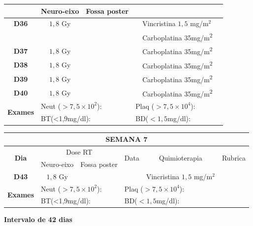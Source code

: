 \documentclass[11pt,a4paper,oldfontcommands]{memoir}
\begin{document}
\begin{center}
\begin{table}[H]
\begin{tabular}{p{1cm}p{2cm}|p{2cm}|p{1cm}|p{4cm}|p{3cm}}
    \cline{2-3}
    \multicolumn{1}{c|}{\multirow{1}{*}{}}&{Neuro-eixo}&{Fossa poster}&& \\
	\hline
	\multicolumn{1}{c|}{\multirow{1}{*}{\textbf{D36}}}&\multicolumn{1}{c|}{\(1,8\) Gy}&&&{Vincristina \(1,5\) mg/m\(^2\)}&\\
	\multicolumn{1}{c|}{\multirow{1}{*}{\textbf{}}}&\multicolumn{1}{c|}{}&&&{Carboplatina 35mg/m\textsuperscript{2}}&\\
    \multicolumn{1}{c|}{\multirow{1}{*}{\textbf{D37}}}&\multicolumn{1}{c|}{\(1,8\) Gy}&&&{Carboplatina 35mg/m\textsuperscript{2}}&\\
    \multicolumn{1}{c|}{\multirow{1}{*}{\textbf{D38}}}&\multicolumn{1}{c|}{\(1,8\) Gy}&&&{Carboplatina 35mg/m\textsuperscript{2}}&\\
    \multicolumn{1}{c|}{\multirow{1}{*}{\textbf{D39}}}&\multicolumn{1}{c|}{\(1,8\) Gy}&&&{Carboplatina 35mg/m\textsuperscript{2}}&\\
    \multicolumn{1}{c|}{\multirow{1}{*}{\textbf{D40}}}&\multicolumn{1}{c|}{\(1,8\) Gy}&&&{Carboplatina 35mg/m\textsuperscript{2}}&\\
    \hline
    \multicolumn{1}{c|}{\multirow{2}{*}{\textbf{Exames}}}&\multicolumn{2}{l|}{Neut (\(>7,5\times10^2\)):}&\multicolumn{2}{l|}{Plaq (\(>7,5\times10^4\)):}&\\
    \cline{2-6}
    \multicolumn{1}{c|}{\multirow{2}{*}{{}}}&\multicolumn{2}{l|}{BT(<1,9mg/dl):}&\multicolumn{2}{l|}{BD(\(<1,5\)mg/dl):}&
    \\
    \hline
\end{tabular}
\end{table}
\begin{table}[H]
\begin{tabular}{p{1cm}p{2cm}|p{2cm}|p{1cm}|p{4cm}|p{3cm}}
	\hline
	\multicolumn{6}{c}{\textbf{SEMANA 7}}\\
\hline
    \multicolumn{1}{c|}{\multirow{2}{*}{\textbf{Dia}}}&\multicolumn{2}{c|}{Dose RT}&\multicolumn{1}{c|}{\multirow{2}{*}{Data}}&\multicolumn{1}{c|}{\multirow{2}{*}{Quimioterapia}}&\multicolumn{1}{c}{\multirow{2}{*}{Rubrica}} \\
    \cline{2-3}
    \multicolumn{1}{c|}{\multirow{1}{*}{}}&{Neuro-eixo}&{Fossa poster}&& \\
	\hline
	\multicolumn{1}{c|}{\multirow{1}{*}{\textbf{D43}}}&\multicolumn{1}{c|}{\(1,8\) Gy}&&&{Vincristina \(1,5\) mg/m\(^2\)}&\\
    \hline
    \multicolumn{1}{c|}{\multirow{2}{*}{\textbf{Exames}}}&\multicolumn{2}{l|}{Neut (\(>7,5\times10^2\)):}&\multicolumn{2}{l|}{Plaq (\(>7,5\times10^4\)):}&\\
    \cline{2-6}
    \multicolumn{1}{c|}{\multirow{2}{*}{{}}}&\multicolumn{2}{l|}{BT(<1,9mg/dl):}&\multicolumn{2}{l|}{BD(\(<1,5\)mg/dl):}&
    \\
    \hline
\end{tabular}
\end{table}
\textbf{Intervalo de 42 dias}\\
\end{center}
\end{document}
